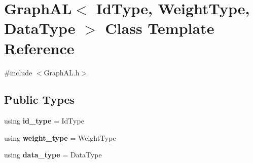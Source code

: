\hypertarget{class_graph_a_l}{}\section{Graph\+AL$<$ Id\+Type, Weight\+Type, Data\+Type $>$ Class Template Reference}
\label{class_graph_a_l}


{\ttfamily \#include $<$Graph\+A\+L.\+h$>$}

\subsection*{Public Types}
\begin{DoxyCompactItemize}
\item 
\mbox{\label{class_graph_a_l_a270538bd4b1f3cec908bf6ede7bfcdd4}} 
using {\bfseries id\+\_\+type} = Id\+Type
\item 
\mbox{\label{class_graph_a_l_a160a0a06c87cd9585316317510d40a43}} 
using {\bfseries weight\+\_\+type} = Weight\+Type
\item 
\mbox{\label{class_graph_a_l_ab9bb840393b9d4bc9c3fb7a4bd49f96c}} 
using {\bfseries data\+\_\+type} = Data\+Type
\end{DoxyCompactItemize}
